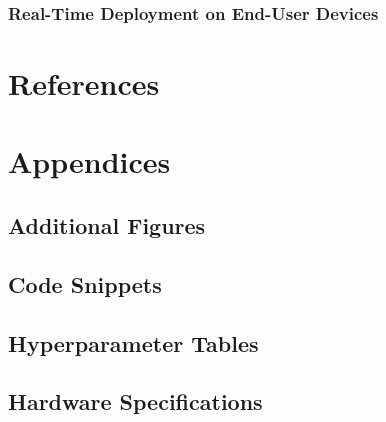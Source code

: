 \documentclass[a4paper,12pt]{report}
\begin{document}
\subsection{Real-Time Deployment on End-User Devices}

\chapter{References}
\chapter{Appendices}
\section{Additional Figures}
\section{Code Snippets}
\section{Hyperparameter Tables}
\section{Hardware Specifications}
\end{document}
